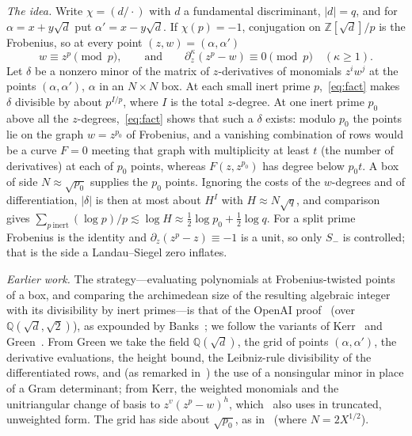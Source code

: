 \documentclass[11pt]{amsart}
\newcommand{\Z}{\mathbb{Z}}
\newcommand{\Q}{\mathbb{Q}}
\newcommand{\sd}{\sqrt{d}}
\begin{document}
\emph{The idea.} Write $\chi=(d/\cdot)$ with $d$ a fundamental discriminant, $|d|=q$, and for
$\alpha=x+y\sd$ put $\alpha'=x-y\sd$. If $\chi(p)=-1$, conjugation on $\Z[\sd]/p$ is the
Frobenius, so at every point $(z,w)=(\alpha,\alpha')$
\begin{equation}\label{eq:fact}
w\equiv z^p\pmod p,\qquad\text{and}\qquad\partial_z^\kappa(z^p-w)\equiv0\pmod p\quad(\kappa\ge1).
\end{equation}
Let $\delta$ be a nonzero minor of the matrix of $z$-derivatives of monomials $z^iw^j$ at the points
$(\alpha,\alpha')$, $\alpha$ in an $N\times N$ box. At each small inert prime $p$,~\eqref{eq:fact}
makes $\delta$ divisible by about $p^{I/p}$, where $I$ is the total $z$-degree. At one inert prime
$p_0$ above all the $z$-degrees,~\eqref{eq:fact} shows that such a $\delta$ exists: modulo $p_0$ the
points lie on the graph $w=z^{p_0}$ of Frobenius, and a vanishing combination of rows would be a
curve $F=0$ meeting that graph with multiplicity at least $t$ (the number of derivatives) at each
of $p_0$ points, whereas $F(z,z^{p_0})$ has degree below $p_0t$. A box of side $N\approx\sqrt{p_0}$
supplies the $p_0$ points.
Ignoring the costs of the $w$-degrees and of differentiation, $|\delta|$ is then at most about $H^I$
with $H\approx N\sqrt q$, and comparison gives
$\sum_{p\ \mathrm{inert}}(\log p)/p\lesssim\log H\approx\frac12\log p_0+\frac12\log q$. For a split
prime Frobenius is the identity and $\partial_z(z^p-z)\equiv-1$ is a unit, so only $S_-$ is controlled; that is the side a Landau--Siegel
zero inflates.

\emph{Earlier work.} The strategy---evaluating polynomials at Frobenius-twisted points of a box,
and comparing the archimedean size of the resulting algebraic integer with its divisibility by inert
primes---is that of the OpenAI proof~\cite{OpenAI} (over $\Q(\sd,\sqrt2)$), as expounded by
Banks~\cite{Banks}; we follow the variants of Kerr~\cite{Kerr} and Green~\cite{Green}. From Green we
take the field $\Q(\sd)$, the grid of points $(\alpha,\alpha')$, the derivative evaluations, the
height bound, the Leibniz-rule divisibility of the differentiated rows, and (as remarked
in~\cite[\S2]{Green}) the use of a nonsingular minor in place of a Gram determinant; from Kerr, the weighted
monomials and the unitriangular change of basis to $z^v(z^p-w)^h$, which~\cite[Lemma~5.1]{Green}
also uses in truncated, unweighted form. The grid has side about $\sqrt{p_0}$, as in~\cite{Green}
(where $N=2X^{1/2}$).
\end{document}
